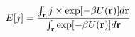 \documentclass[12pt]{article}
\begin{document}
\begin{displaymath}
E[j] = 
{
{
\int_{\bf r} 
j \times  { \exp[-\beta U({\bf r}) ] }
d{\bf r}
}
\over
{
\int_{\bf r}
{ \exp[-\beta U({\bf r}) ] }
d{\bf r}
}
}
\end{displaymath}
\end{document}
